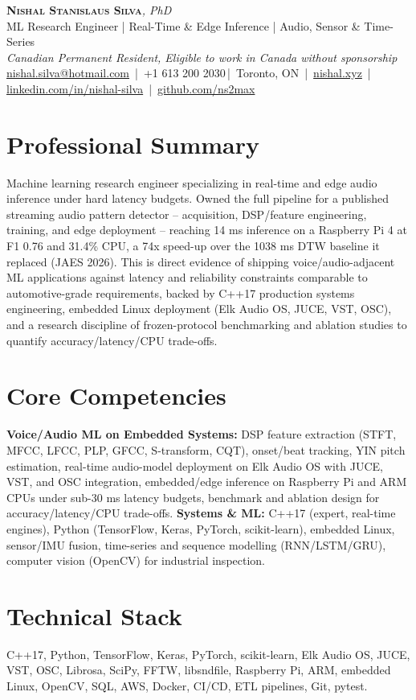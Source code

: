 \documentclass[11pt]{article}
\makeatletter
\newcommand{\cvName}{Nishal Stanislaus Silva}
\newcommand{\cvEmail}{nishal.silva@hotmail.com}
\newcommand{\cvPhone}{+1 613 200 2030}
\newcommand{\cvCity}{Toronto, ON}
\newcommand{\cvSite}{https://nishal.xyz}
\newcommand{\cvLinkedIn}{https://www.linkedin.com/in/nishal-silva}
\newcommand{\cvGitHub}{https://github.com/ns2max}
\newcommand{\cvStatus}{Canadian Permanent Resident, Eligible to work in Canada without sponsorship}
\newcommand{\cvTagline}{ML Research Engineer | Real-Time \& Edge Inference | Audio, Sensor \& Time-Series}
\makeatother
\begin{document}
\pagestyle{empty}
\begin{center}
    {\LARGE \scshape \textbf{\cvName}}{\large \textit{, PhD}}\\[1pt]
    {\small \cvTagline}\\[1pt]
    {\footnotesize\textit{\cvStatus}}\\[1pt]
    {\small
    \href{mailto:\cvEmail}{\cvEmail} \,|\, \cvPhone \,|\, \cvCity
    \,|\, \href{\cvSite}{nishal.xyz} \,|\, \href{\cvLinkedIn}{linkedin.com/in/nishal-silva}
    \,|\, \href{\cvGitHub}{github.com/ns2max}}
\end{center}

\section*{Professional Summary}
Machine learning research engineer specializing in real-time and edge audio inference under hard latency budgets. Owned the full pipeline for a published streaming audio pattern detector -- acquisition, DSP/feature engineering, training, and edge deployment -- reaching 14 ms inference on a Raspberry Pi 4 at F1 0.76 and 31.4\% CPU, a 74x speed-up over the 1038 ms DTW baseline it replaced (JAES 2026). This is direct evidence of shipping voice/audio-adjacent ML applications against latency and reliability constraints comparable to automotive-grade requirements, backed by C++17 production systems engineering, embedded Linux deployment (Elk Audio OS, JUCE, VST, OSC), and a research discipline of frozen-protocol benchmarking and ablation studies to quantify accuracy/latency/CPU trade-offs.

\section*{Core Competencies}
\textbf{Voice/Audio ML on Embedded Systems:} DSP feature extraction (STFT, MFCC, LFCC, PLP, GFCC, S-transform, CQT), onset/beat tracking, YIN pitch estimation, real-time audio-model deployment on Elk Audio OS with JUCE, VST, and OSC integration, embedded/edge inference on Raspberry Pi and ARM CPUs under sub-30 ms latency budgets, benchmark and ablation design for accuracy/latency/CPU trade-offs. \textbf{Systems \& ML:} C++17 (expert, real-time engines), Python (TensorFlow, Keras, PyTorch, scikit-learn), embedded Linux, sensor/IMU fusion, time-series and sequence modelling (RNN/LSTM/GRU), computer vision (OpenCV) for industrial inspection.

\section*{Technical Stack}
C++17, Python, TensorFlow, Keras, PyTorch, scikit-learn, Elk Audio OS, JUCE, VST, OSC, Librosa, SciPy, FFTW, libsndfile, Raspberry Pi, ARM, embedded Linux, OpenCV, SQL, AWS, Docker, CI/CD, ETL pipelines, Git, pytest.
\end{document}
